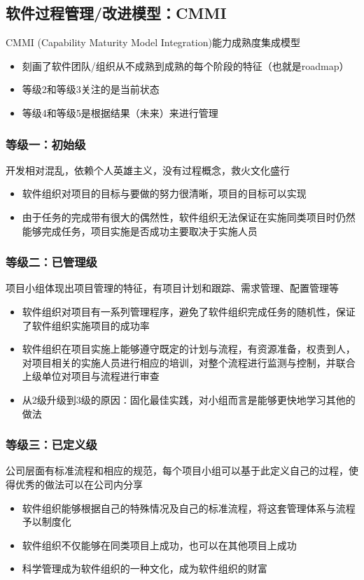 \subsection{软件过程管理/改进模型：CMMI}
CMMI (Capability Maturity Model Integration)能力成熟度集成模型
\begin{itemize}
    \item 刻画了软件团队/组织从不成熟到成熟的每个阶段的特征（也就是roadmap）
    \item 等级2和等级3关注的是当前状态
    \item 等级4和等级5是根据结果（未来）来进行管理
\end{itemize}

\subsubsection{等级一：初始级}
开发相对混乱，依赖个人英雄主义，没有过程概念，救火文化盛行
\begin{itemize}
    \item 软件组织对项目的目标与要做的努力很清晰，项目的目标可以实现
    \item 由于任务的完成带有很大的偶然性，软件组织无法保证在实施同类项目时仍然能够完成任务，项目实施是否成功主要取决于实施人员
\end{itemize}

\subsubsection{等级二：已管理级}
项目小组体现出项目管理的特征，有项目计划和跟踪、需求管理、配置管理等
\begin{itemize}
    \item 软件组织对项目有一系列管理程序，避免了软件组织完成任务的随机性，保证了软件组织实施项目的成功率
    \item 软件组织在项目实施上能够遵守既定的计划与流程，有资源准备，权责到人，对项目相关的实施人员进行相应的培训，对整个流程进行监测与控制，并联合上级单位对项目与流程进行审查
    \item 从2级升级到3级的原因：固化最佳实践，对小组而言是能够更快地学习其他的做法
\end{itemize}

\subsubsection{等级三：已定义级}
公司层面有标准流程和相应的规范，每个项目小组可以基于此定义自己的过程，使得优秀的做法可以在公司内分享
\begin{itemize}
    \item 软件组织能够根据自己的特殊情况及自己的标准流程，将这套管理体系与流程予以制度化
    \item 软件组织不仅能够在同类项目上成功，也可以在其他项目上成功
    \item 科学管理成为软件组织的一种文化，成为软件组织的财富
\end{itemize}

